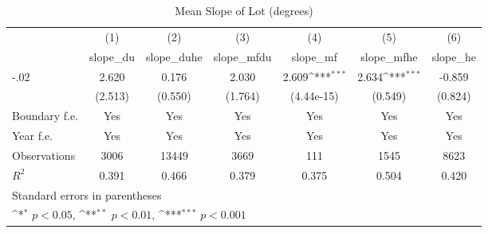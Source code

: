 \begin{table}[htbp]\centering
\def\sym#1{\ifmmode^{#1}\else\(^{#1}\)\fi}
\caption{Mean Slope of Lot (degrees)}
\begin{tabular}{l*{6}{c}}
\hline\hline
                    &\multicolumn{1}{c}{(1)}&\multicolumn{1}{c}{(2)}&\multicolumn{1}{c}{(3)}&\multicolumn{1}{c}{(4)}&\multicolumn{1}{c}{(5)}&\multicolumn{1}{c}{(6)}\\
                    &\multicolumn{1}{c}{slope\_du}&\multicolumn{1}{c}{slope\_duhe}&\multicolumn{1}{c}{slope\_mfdu}&\multicolumn{1}{c}{slope\_mf}&\multicolumn{1}{c}{slope\_mfhe}&\multicolumn{1}{c}{slope\_he}\\
\hline
-.02                &       2.620         &       0.176         &       2.030         &       2.609\sym{***}&       2.634\sym{***}&      -0.859         \\
                    &     (2.513)         &     (0.550)         &     (1.764)         &  (4.44e-15)         &     (0.549)         &     (0.824)         \\
[1em]
Boundary f.e.       &         Yes         &         Yes         &         Yes         &         Yes         &         Yes         &         Yes         \\
[1em]
Year f.e.           &         Yes         &         Yes         &         Yes         &         Yes         &         Yes         &         Yes         \\
\hline
Observations        &        3006         &       13449         &        3669         &         111         &        1545         &        8623         \\
\(R^{2}\)           &       0.391         &       0.466         &       0.379         &       0.375         &       0.504         &       0.420         \\
\hline\hline
\multicolumn{7}{l}{\footnotesize Standard errors in parentheses}\\
\multicolumn{7}{l}{\footnotesize \sym{*} \(p<0.05\), \sym{**} \(p<0.01\), \sym{***} \(p<0.001\)}\\
\end{tabular}
\end{table}

